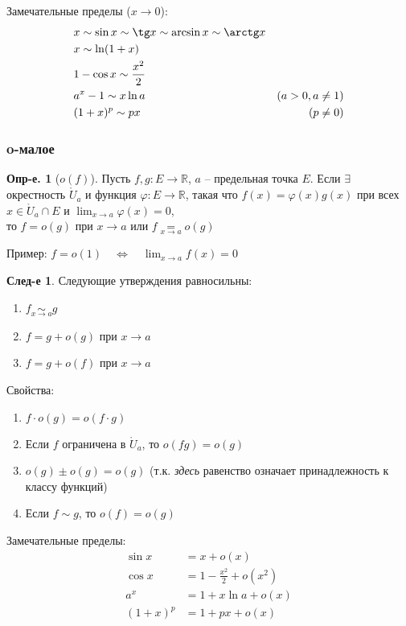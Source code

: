 \documentclass[a4paper,12pt]{article}
\numberwithin{figure}{section}
\theoremstyle{definition}
\newtheorem{definition}{Опр-е.}[section]
\theoremstyle{definition}
\newtheorem*{corollary}{След-е} %
\def\DS{\displaystyle}
\def\ringU{\mathring{U}}
\def\mathR{\mathbb{R}}
\def\on{\!:}
\begin{document}
\bigskip
Замечательные пределы ($x\to0$):
\begin{align*}
	   & x \sim \sin x \sim \tg x \sim \arcsin x \sim \arctg x
	\\ & x \sim \ln(1+x)
	\\ & 1 - \cos x \sim \frac{x^2}2
	\\ & a^x-1 \sim x \ln a		& (a>0, a\ne1)
	\\ & (1+x)^p \sim px		& (p\ne0)
\end{align*}


\subsubsection{o-малое}

\begin{definition}[$o(f)$]
	Пусть $f,g\on E\to\mathR$, $a$ -- предельная точка $E$.
	Если $\exists$ окрестность $\ringU_a$ и функция $\varphi\on E\to\mathR$,
	такая что $f(x)=\varphi(x)g(x)$ при всех $x\in\ringU_a\cap E$
	и $\DS \lim_{x\to a}\varphi(x)=0$,\\
	то $f = o(g)$ при $x\to a$ или $\DS f \underset{x\to a}{=} o(g)$
\end{definition}

\medskip
Пример: $\DS f=o(1) \quad \Longleftrightarrow \quad \lim_{x\to a}f(x)=0$
\medskip

\begin{corollary}
	Следующие утверждения равносильны: \begin{enumerate}
		\item $\DS f \underset{x\to a}\sim g$
		\item $f=g+o(g)$ при $x\to a$
		\item $f=g+o(f)$ при $x\to a$
	\end{enumerate}
\end{corollary}

\medskip
Свойства:
\begin{enumerate}
	\item $f \cdot o(g) = o(f \cdot g)$
	\item Если $f$ ограничена в $\ringU_a$, то $o(fg)=o(g)$
	\item $o(g) \pm o(g) = o(g)$ \medspace
		  {\small (т.к. \textit{здесь} равенство означает принадлежность к классу функций)}
	\item Если $f \sim g$, то $o(f)=o(g)$
\end{enumerate}

\medskip
Замечательные пределы:
\begin{align*}
	   \sin x &= x + o(x)
	\\ \cos x &= 1 - \frac{x^2}2 + o(x^2)
	\\ a^x &= 1 + x \ln a + o(x)
	\\ (1+x)^p &= 1 + px + o(x)
\end{align*}
\end{document}
